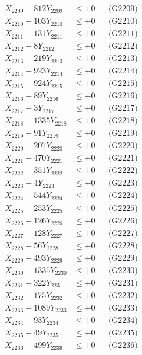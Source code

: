 \documentclass[a4paper,10pt]{article}
\begin{document}
{\begin{align}
X_{2209} - 812Y_{2209} &\leq +0 && \text{(G2209)} \\
X_{2210} - 103Y_{2210} &\leq +0 && \text{(G2210)} \\
\allowbreak
X_{2211} - 131Y_{2211} &\leq +0 && \text{(G2211)} \\
X_{2212} - 8Y_{2212} &\leq +0 && \text{(G2212)} \\
X_{2213} - 219Y_{2213} &\leq +0 && \text{(G2213)} \\
X_{2214} - 923Y_{2214} &\leq +0 && \text{(G2214)} \\
X_{2215} - 924Y_{2215} &\leq +0 && \text{(G2215)} \\
X_{2216} - 89Y_{2216} &\leq +0 && \text{(G2216)} \\
X_{2217} - 3Y_{2217} &\leq +0 && \text{(G2217)} \\
X_{2218} - 1335Y_{2218} &\leq +0 && \text{(G2218)} \\
X_{2219} - 91Y_{2219} &\leq +0 && \text{(G2219)} \\
X_{2220} - 207Y_{2220} &\leq +0 && \text{(G2220)} \\
\allowbreak
X_{2221} - 470Y_{2221} &\leq +0 && \text{(G2221)} \\
X_{2222} - 351Y_{2222} &\leq +0 && \text{(G2222)} \\
X_{2223} - 4Y_{2223} &\leq +0 && \text{(G2223)} \\
X_{2224} - 544Y_{2224} &\leq +0 && \text{(G2224)} \\
X_{2225} - 253Y_{2225} &\leq +0 && \text{(G2225)} \\
X_{2226} - 126Y_{2226} &\leq +0 && \text{(G2226)} \\
X_{2227} - 128Y_{2227} &\leq +0 && \text{(G2227)} \\
X_{2228} - 56Y_{2228} &\leq +0 && \text{(G2228)} \\
X_{2229} - 493Y_{2229} &\leq +0 && \text{(G2229)} \\
X_{2230} - 1335Y_{2230} &\leq +0 && \text{(G2230)} \\
\allowbreak
X_{2231} - 322Y_{2231} &\leq +0 && \text{(G2231)} \\
X_{2232} - 175Y_{2232} &\leq +0 && \text{(G2232)} \\
X_{2233} - 1089Y_{2233} &\leq +0 && \text{(G2233)} \\
X_{2234} - 93Y_{2234} &\leq +0 && \text{(G2234)} \\
X_{2235} - 49Y_{2235} &\leq +0 && \text{(G2235)} \\
X_{2236} - 499Y_{2236} &\leq +0 && \text{(G2236)} \\

\end{align}}
\end{document}
